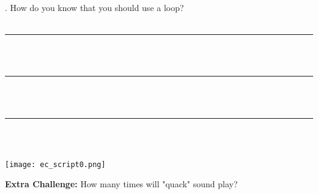 . How do you know that you should use a loop? \\ \\
\noindent \rule{18.5cm}{0.5pt} \\ \\
\noindent \rule{18.5cm}{0.5pt} \\ \\
\noindent \rule{18.5cm}{0.5pt} \\

\noindent \dotfill \\
\begin{center}
\texttt{[image: ec\_script0.png]}
\end{center}

\noindent \textbf{Extra Challenge:} How many times will "quack" sound play? \numbox
